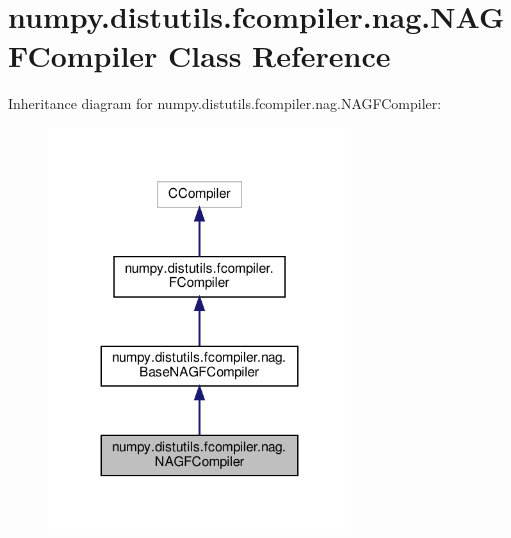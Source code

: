 \hypertarget{classnumpy_1_1distutils_1_1fcompiler_1_1nag_1_1NAGFCompiler}{}\section{numpy.\+distutils.\+fcompiler.\+nag.\+N\+A\+G\+F\+Compiler Class Reference}
\label{classnumpy_1_1distutils_1_1fcompiler_1_1nag_1_1NAGFCompiler}


Inheritance diagram for numpy.\+distutils.\+fcompiler.\+nag.\+N\+A\+G\+F\+Compiler\+:
\nopagebreak
\begin{figure}[H]
\begin{center}
\leavevmode
\includegraphics[width=227pt]{classnumpy_1_1distutils_1_1fcompiler_1_1nag_1_1NAGFCompiler__inherit__graph}
\end{center}
\end{figure}


